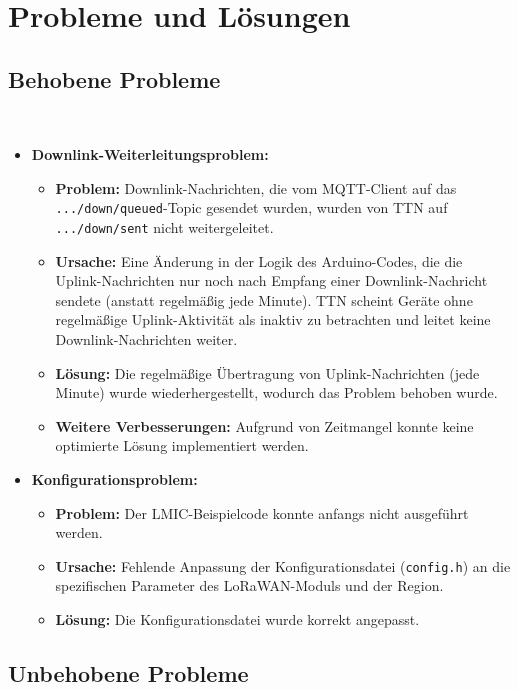 \documentclass[12pt,a4paper]{article}
\begin{document}
\newpage

\section{Probleme und Lösungen}

\subsection{Behobene Probleme}
\\
\begin{itemize}
    \item \textbf{Downlink-Weiterleitungsproblem:}
    \begin{itemize}
        \item \textbf{Problem:} Downlink-Nachrichten, die vom MQTT-Client auf das \\ \texttt{.../down/queued}-Topic gesendet wurden, wurden von TTN auf \\ \texttt{.../down/sent} nicht weitergeleitet.
        \item \textbf{Ursache:} Eine Änderung in der Logik des Arduino-Codes, die die Uplink-Nachrichten nur noch nach Empfang einer Downlink-Nachricht sendete (anstatt regelmäßig jede Minute). TTN scheint Geräte ohne regelmäßige Uplink-Aktivität als inaktiv zu betrachten und leitet keine Downlink-Nachrichten weiter.
        \item \textbf{Lösung:} Die regelmäßige Übertragung von Uplink-Nachrichten (jede Minute) wurde wiederhergestellt, wodurch das Problem behoben wurde.
        \item \textbf{Weitere Verbesserungen:} Aufgrund von Zeitmangel konnte keine optimierte Lösung implementiert werden.
    \end{itemize}
    \item \textbf{Konfigurationsproblem:}
    \begin{itemize}
        \item \textbf{Problem:} Der LMIC-Beispielcode konnte anfangs nicht ausgeführt werden.
        \item \textbf{Ursache:} Fehlende Anpassung der Konfigurationsdatei (\texttt{config.h}) an die spezifischen Parameter des LoRaWAN-Moduls und der Region.
        \item \textbf{Lösung:} Die Konfigurationsdatei wurde korrekt angepasst.
    \end{itemize}
\end{itemize}

\subsection{Unbehobene Probleme}
\end{document}

